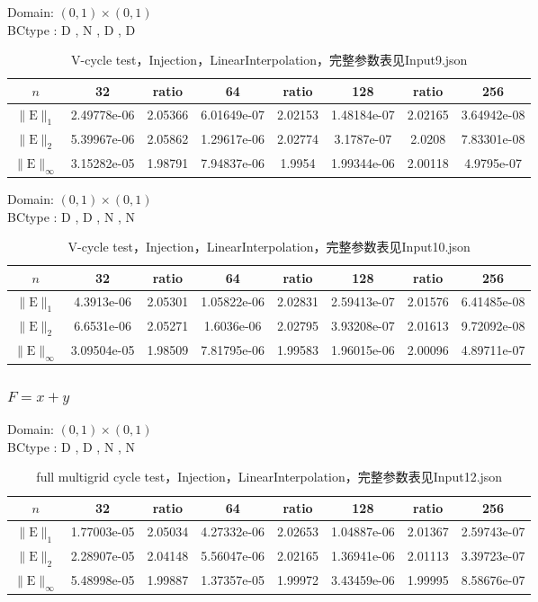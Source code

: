 \documentclass[a4paper,twoside]{ctexart}
\begin{document}
\noindent Domain: $(0,1)\times(0,1)$\\
BCtype : D , N , D , D
\begin{table}[htbp]
\centering\begin{tabular}{c|ccccccc}
\hline
$n$&32&ratio&64&ratio&128&ratio&256\\
\hline
$\|\mathrm{E}\|_1$&2.49778e-06&2.05366&6.01649e-07&2.02153&1.48184e-07&2.02165&3.64942e-08\\
\hline
$\|\mathrm{E}\|_2$&5.39967e-06&2.05862&1.29617e-06&2.02774&3.1787e-07&2.0208&7.83301e-08\\
\hline
$\|\mathrm{E}\|_{\infty}$&3.15282e-05&1.98791&7.94837e-06&1.9954&1.99344e-06&2.00118&4.9795e-07\\
\hline
\end{tabular}
\caption{V-cycle test，Injection，LinearInterpolation，完整参数表见Input9.json}
\end{table}

\noindent Domain: $(0,1)\times(0,1)$\\
BCtype : D , D , N , N
\begin{table}[htbp]
\centering\begin{tabular}{c|ccccccc}
\hline
$n$&32&ratio&64&ratio&128&ratio&256\\
\hline
$\|\mathrm{E}\|_1$&4.3913e-06&2.05301&1.05822e-06&2.02831&2.59413e-07&2.01576&6.41485e-08\\
\hline
$\|\mathrm{E}\|_2$&6.6531e-06&2.05271&1.6036e-06&2.02795&3.93208e-07&2.01613&9.72092e-08\\
\hline
$\|\mathrm{E}\|_{\infty}$&3.09504e-05&1.98509&7.81795e-06&1.99583&1.96015e-06&2.00096&4.89711e-07\\
\hline
\end{tabular}
\caption{V-cycle test，Injection，LinearInterpolation，完整参数表见Input10.json}
\end{table}
\newpage
\subsubsection{$F = x + y$}

\noindent Domain: $(0,1)\times(0,1)$\\
BCtype : D , D , N , N
\begin{table}[htbp]
\centering\begin{tabular}{c|ccccccc}
\hline
$n$&32&ratio&64&ratio&128&ratio&256\\
\hline
$\|\mathrm{E}\|_1$&1.77003e-05&2.05034&4.27332e-06&2.02653&1.04887e-06&2.01367&2.59743e-07\\
\hline
$\|\mathrm{E}\|_2$&2.28907e-05&2.04148&5.56047e-06&2.02165&1.36941e-06&2.01113&3.39723e-07\\
\hline
$\|\mathrm{E}\|_{\infty}$&5.48998e-05&1.99887&1.37357e-05&1.99972&3.43459e-06&1.99995&8.58676e-07\\
\hline
\end{tabular}
\caption{full multigrid cycle test，Injection，LinearInterpolation，完整参数表见Input12.json}
\end{table}
\end{document}

